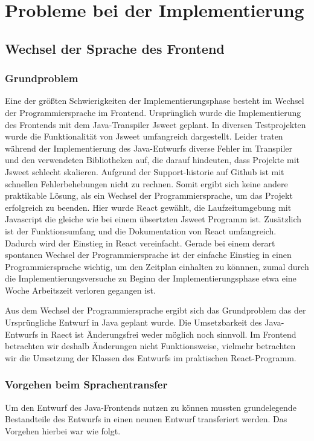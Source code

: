 \section{Probleme bei der Implementierung}

\subsection{Wechsel der Sprache des Frontend}
\subsubsection{Grundproblem}
Eine der größten Schwierigkeiten der Implementierungsphase besteht im Wechsel der Programmiersprache im Frontend.
Ursprünglich wurde die Implementierung des Frontends mit dem Java-Transpiler Jsweet geplant.
In diversen Testprojekten wurde die Funktionalität von Jsweet umfangreich dargestellt.
Leider traten während der Implementierung des Java-Entwurfs diverse Fehler im Transpiler und den verwendeten Bibliotheken auf, die darauf hindeuten, dass Projekte mit Jsweet schlecht skalieren.
Aufgrund der Support-historie auf Github ist mit schnellen Fehlerbehebungen nicht zu rechnen.
Somit ergibt sich keine andere praktikable Lösung, als ein Wechsel der Programmiersprache, um das Projekt erfolgreich zu beenden.
Hier wurde React gewählt, die Laufzeitumgebung mit Javascript die gleiche wie bei einem übsertzten Jsweet Programm ist.
Zusätzlich ist der Funktionsumfang und die Dokumentation von React umfangreich.
Dadurch wird der Einstieg in React vereinfacht.
Gerade bei einem derart spontanen Wechsel der Programmiersprache ist der einfache Einstieg in einen Programmiersprache wichtig, um den Zeitplan einhalten zu könnnen, zumal durch die Implementierungsversuche zu Beginn der Implementierungsphase etwa eine Woche Arbeitszeit verloren gegangen ist.

Aus dem Wechsel der Programmiersprache ergibt sich das Grundproblem das der Ursprüngliche Entwurf in Java geplant wurde. Die Umsetzbarkeit des Java-Entwurfs in Raect ist Änderungsfrei weder möglich noch sinnvoll.
Im Frontend betrachten wir deshalb Änderungen nicht Funktionsweise, vielmehr betrachten wir die Umsetzung der Klassen des Entwurfs im praktischen React-Programm.

\subsubsection{Vorgehen beim Sprachentransfer}
Um den Entwurf des Java-Frontends nutzen zu können mussten grundelegende Bestandteile des Entwurfs in einen neunen Entwurf transferiert werden.
Das Vorgehen hierbei war wie folgt.

